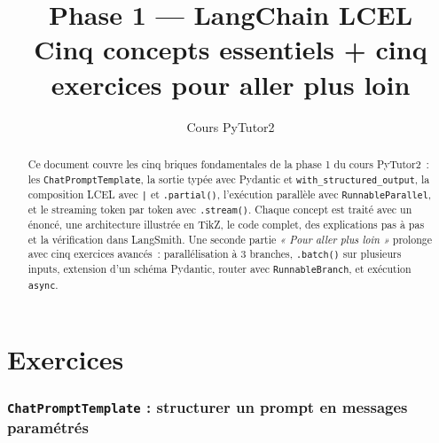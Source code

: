 \documentclass[11pt,a4paper]{article}
\title{\textbf{Phase 1 — LangChain LCEL}\\
\large Cinq concepts essentiels + cinq exercices pour aller plus loin}
\author{Cours PyTutor2}
\date{}
\begin{document}
\maketitle

\begin{abstract}
\noindent
Ce document couvre les cinq briques fondamentales de la phase 1 du cours
PyTutor2~: les \texttt{ChatPromptTemplate}, la sortie typée avec Pydantic
et \texttt{with\_structured\_output}, la composition LCEL avec \texttt{|}
et \texttt{.partial()}, l'exécution parallèle avec
\texttt{RunnableParallel}, et le streaming token par token avec
\texttt{.stream()}. Chaque concept est traité avec un énoncé, une
architecture illustrée en TikZ, le code complet, des explications pas à pas
et la vérification dans LangSmith. Une seconde partie
\emph{« Pour aller plus loin »} prolonge avec cinq exercices avancés~:
parallélisation à 3 branches, \texttt{.batch()} sur plusieurs inputs,
extension d'un schéma Pydantic, router avec \texttt{RunnableBranch}, et
exécution \texttt{async}.
\end{abstract}

\tableofcontents
\bigskip

\part{Exercices}

\section{\texttt{ChatPromptTemplate} : structurer un prompt en messages paramétrés}
\end{document}
